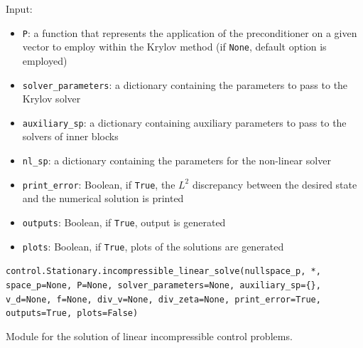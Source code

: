 \documentclass[letterpaper,10pt,english]{sphinxmanual}
\begin{document}
Input:
\begin{itemize}
\item \texttt{P}: a function that represents the application of the
            preconditioner on a given vector to employ within the Krylov
            method (if \texttt{None}, default option is employed)

\item \texttt{solver{\_}parameters}: a dictionary containing the parameters to pass
            to the Krylov solver

\item \texttt{auxiliary{\_}sp}: a dictionary containing auxiliary parameters to
            pass to the solvers of inner blocks

\item \texttt{nl{\_}sp}: a dictionary containing the parameters for the non-linear
            solver

\item \texttt{print{\_}error}: Boolean, if \texttt{True}, the $L^2$ discrepancy between the
            desired state and the numerical solution is printed

\item \texttt{outputs}: Boolean, if \texttt{True}, output is generated

\item \texttt{plots}: Boolean, if \texttt{True}, plots of the solutions are generated
\end{itemize}

\vspace{3ex}

\texttt{control.Stationary.incompressible{\_}linear{\_}solve(nullspace{\_}p, *, space{\_}p=None, P=None, solver{\_}parameters=None, auxiliary{\_}sp=\{\}, v{\_}d=None, f=None, div{\_}v=None, div{\_}zeta=None, print{\_}error=True, outputs=True, plots=False)}

Module for the solution of linear incompressible control problems.
\end{document}
